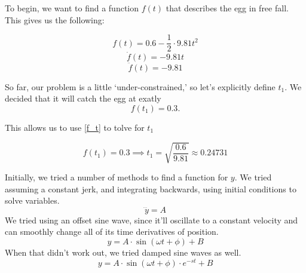 \documentclass[nofoot,pdf-a,balance,colorlinks,upint,subscriptcorrection,varvw,mathalfa=cal=boondoxo]{asmeconf}
\begin{document}
        To begin, we want to find a function $f\left(t\right)$ that describes the egg in free fall. This gives us the following:

        \begin{equation}\label{f_t}
            f\left(t\right) = 0.6 - \frac{1}{2} \cdot 9.81 t^2
        \end{equation}
        \begin{equation}
            \dot{f}\left(t\right) = - 9.81 t
        \end{equation}
        \begin{equation}
            \ddot{f}\left(t\right) = - 9.81
        \end{equation}

         So far, our problem is a little `under-constrained,' so let's explicitly define $t_1$. We decided that it will catch the egg at exatly
	\begin{equation}
	f\left(t_1\right) = 0.3. 
	\end{equation}

	This allows us to use \eqref{f_t} to tolve for $t_1$

         \begin{equation} 
             f(t_1) = 0.3 \implies t_1 = \sqrt{\frac{0.6}{9.81}} \approx 0.24731
         \end{equation}
     
       Initially, we tried a number of methods to find a function for $y$. We tried assuming a constant jerk, and integrating backwards, using initial conditions to solve variables. 
    \begin{equation*}
        \dddot{y} = A
    \end{equation*}
        We tried using an offset sine wave, since it'll oscillate to a constant velocity and can smoothly change all of its time derivatives of position.
    \begin{equation*}
        y = A \cdot \sin{\left(\omega t + \phi\right)} + B
    \end{equation*}
        When that didn't work out, we tried damped sine waves as well.
    \begin{equation*}
        y = A \cdot \sin{\left(\omega t + \phi\right)}\cdot e^{-st} + B
    \end{equation*}
\end{document}
